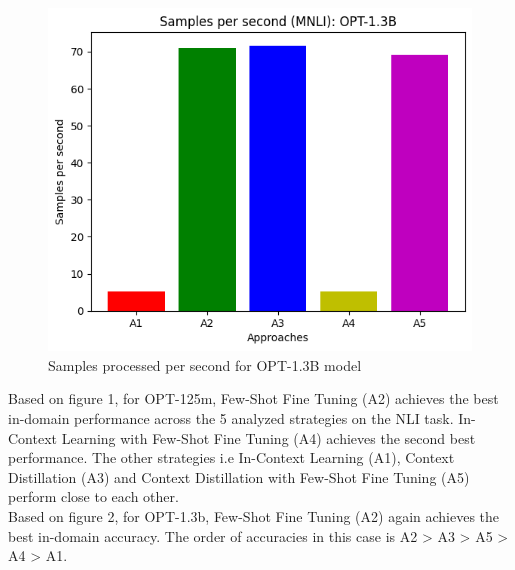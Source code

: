 \documentclass[10pt,twocolumn,letterpaper]{article}
\begin{document}
\begin{figure}[H]
\begin{center}
\includegraphics[width=0.8\linewidth]{figures/samples-opt1_3B.png}
\end{center}
\caption{Samples processed per second for OPT-1.3B model}
\end{figure}


Based on figure 1, for OPT-125m, Few-Shot Fine Tuning (A2) achieves the best in-domain performance across the 5 analyzed strategies on the NLI task. In-Context Learning with Few-Shot Fine Tuning (A4) achieves the second best performance. The other strategies i.e In-Context Learning (A1), Context Distillation (A3) and Context Distillation with Few-Shot Fine Tuning (A5) perform close to each other.\\

Based on figure 2, for OPT-1.3b, Few-Shot Fine Tuning (A2) again achieves the best in-domain accuracy. The order of accuracies in this case is A2 > A3 > A5 > A4 > A1.\\


\end{document}
